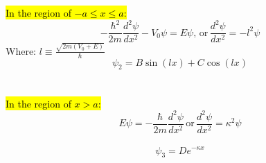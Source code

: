 \documentclass{article}
\begin{document}
\noindent \hl{ In the region of $-a \leq x \leq a$:}
\begin{equation}
    - \frac{\hbar^2}{2m} \frac{d^2 \psi}{d x^2} - V_0 \psi = E \psi,  \, \text{or} \, \frac{d^2 \psi}{d x^2} = - l^2 \psi
\end{equation}
Where: \(l \equiv \frac{\sqrt{2m(V_0 + E)}}{\hbar}\)
\begin{equation}
    \psi_2 = B \sin(l x) + C \cos(l x)
\end{equation}
\\ \\
\noindent \hl{In the region of $x > a$:} 
\begin{equation}
E \psi = -\frac{\hbar}{2m} \frac{d^2 \psi}{dx^2} \, \text{or} \, \frac{d^2 \psi}{dx^2} = \kappa^2 \psi
\end{equation}
\\ 
\begin{equation}
\psi_3 = De^{-\kappa x}
\end{equation}
\end{document}
